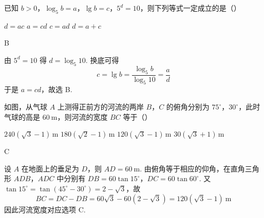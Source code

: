 \begin{problem}
已知 \(b > 0\)，\(\log_5 b = a\)，\(\lg b = c\)，\(5^{d} = 10\)，则下列等式一定成立的是（\quad）

\choices
    {\(d = ac\)}
    {\(a = cd\)}
    {\(c = ad\)}
    {\(d = a + c\)}
\begin{answer}
B
\end{answer}

\begin{solution}
由 \(5^{d}=10\) 得 \(d=\log_{5}10\). 换底可得
\[
c=\lg b=\frac{\log_{5}b}{\log_{5}10}=\frac{a}{d}
\]
于是 \(a=cd\)，故选 B.
\end{solution}
\end{problem}

\begin{problem}
如图，从气球 \(A\) 上测得正前方的河流的两岸 \(B\)，\(C\) 的俯角分别为 \(75^{\circ}\)，\(30^{\circ}\)，此时气球的高是 \(60 \mathrm{~m}\)，则河流的宽度 \(BC\) 等于（\quad）


\choices
    {\(240(\sqrt{3} - 1)\mathrm{\,m}\)}
    {\(180(\sqrt{2} - 1)\mathrm{\,m}\)}
    {\(120(\sqrt{3} - 1)\mathrm{\,m}\)}
    {\(30(\sqrt{3} + 1)\mathrm{\,m}\)}
\begin{answer}
C
\end{answer}

\begin{solution}
设 \(A\) 在地面上的垂足为 \(D\)，则 \(AD=60\mathrm{~m}\). 由俯角等于相应的仰角，在直角三角形 \(ADB\)，\(ADC\) 中分别有
\(DB=60\tan15^{\circ}\)，\(DC=60\tan60^{\circ}\).
又 \(\tan15^{\circ}=\tan(45^{\circ}-30^{\circ})=2-\sqrt3\)，故
\[
BC=DC-DB=60\sqrt3-60(2-\sqrt3)=120(\sqrt3-1)\mathrm{~m}
\]
因此河流宽度对应选项 C.
\end{solution}
\end{problem}

